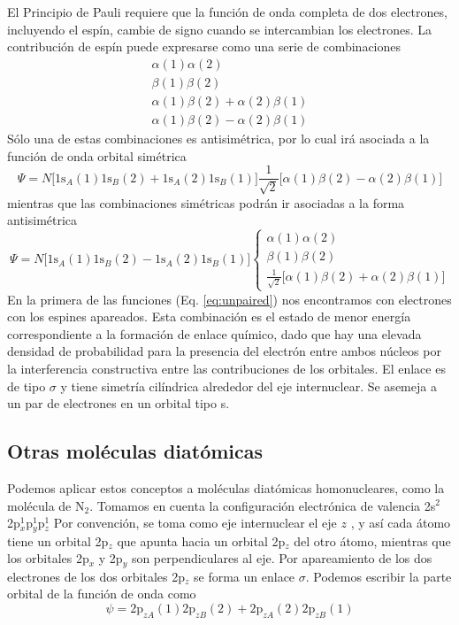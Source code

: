 \documentclass{tufte-handout}
\begin{document}
El Principio de Pauli 
requiere que la función de onda completa de dos electrones, 
incluyendo el espín, cambie de signo cuando se intercambian 
los electrones. La contribución de espín puede expresarse
como una serie de combinaciones 
\begin{gather*}
\alpha(1)\alpha(2)\\
\beta (1)\beta (2)\\
\alpha(1)\beta(2) + \alpha(2)\beta(1)\\
\alpha(1)\beta(2) − \alpha(2)\beta(1)
\end{gather*}
Sólo una de estas combinaciones es antisimétrica, por lo cual
irá asociada a la función de onda orbital simétrica
\begin{equation}
    \Psi=N
    \big[\mathrm{1s}_A(1)\mathrm{1s}_B(2) +\mathrm{1s}_A(2)\mathrm{1s}_B(1)\big]
    \frac{1}{\sqrt{2}}\big[\alpha(1)\beta(2) − \alpha(2)\beta(1)\big]
    \label{eq:unpaired}
\end{equation}
mientras que las combinaciones simétricas podrán ir asociadas
a la forma antisimétrica
\begin{equation}
    \Psi=N
    \big[\mathrm{1s}_A(1)\mathrm{1s}_B(2) -\mathrm{1s}_A(2)\mathrm{1s}_B(1)\big]
\begin{cases}
\alpha(1)\alpha(2)\\
\beta (1)\beta (2)\\ 
\frac{1}{\sqrt{2}}\big[\alpha(1)\beta(2) + \alpha(2)\beta(1)\big]
\end{cases}
\end{equation}
En la primera de las funciones (Eq. \ref{eq:unpaired})
nos encontramos con electrones con los espines apareados.
Esta combinación es el estado de menor energía
correspondiente a la formación de enlace químico,
dado que hay una elevada densidad de 
probabilidad para la presencia del electrón entre ambos
núcleos por la interferencia constructiva entre las
contribuciones de los orbitales. El enlace es de tipo 
$\sigma$ y tiene simetría cilíndrica alrededor del eje
internuclear. Se asemeja a un par de electrones en 
un orbital tipo s.

\subsection{Otras moléculas diatómicas}
Podemos aplicar estos conceptos a moléculas diatómicas
homonucleares, como la molécula de N$_2$. Tomamos en 
cuenta la configuración electrónica de valencia
2s$^2$2p$_x^1$p$_y^1$p$_z^1$
Por convención, se toma como eje internuclear el eje $z$ ,
y así cada átomo tiene un orbital 2p$_z$ que apunta 
hacia un orbital 2p$_z$ del otro átomo, mientras que 
los orbitales 2p$_x$ y 2p$_y$ son perpendiculares al eje. 
Por apareamiento de los dos electrones de los dos orbitales 
2p$_z$ se forma un enlace $\sigma$. Podemos escribir la
parte orbital de la función de onda como
\begin{equation}
 \psi =2\mathrm{p}_{zA}(1)2\mathrm{p}_{zB}(2) + 2\mathrm{p}_{zA}(2)2\mathrm{p}_{zB}(1)
\end{equation} 
\end{document}
